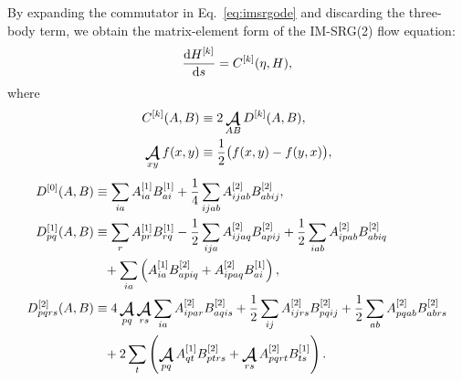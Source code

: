 By expanding the commutator in Eq.\ \eqref{eq:imsrgode} and discarding the three-body term, we obtain the matrix-element form of the IM-SRG(2) flow equation:
\begin{align}
    \frac{\operatorname{d\!} H^{[k]}}{\operatorname{d\!} s} = C^{[k]}(\eta, H), \label{eq:flowmxe}
\end{align}
where
\begin{align}
  C^{[k]}(A, B) &\equiv 2 \antisymm_{A B} D^{[k]}(A, B), \label{eq:commutmxe} \\
  \antisymm_{x y} f(x, y) &\equiv \frac{1}{2} \bigl(f(x, y) - f(y, x)\bigr),
\end{align}
\begin{align}
  D^{[0]}(A, B)
  &\equiv
    \sum_{i a} A^{[1]}_{i a} B^{[1]}_{a i}
    + \frac{1}{4} \sum_{i j a b} A^{[2]}_{i j a b} B^{[2]}_{a b i j},
    \label{eq:flow0} \\
  D^{[1]}_{p q}(A, B)
  &\equiv
    \sum_r A^{[1]}_{p r} B^{[1]}_{r q}
    - \frac{1}{2} \sum_{i j a} A^{[2]}_{i j a q} B^{[2]}_{a p i j}
    + \frac{1}{2} \sum_{i a b} A^{[2]}_{i p a b} B^{[2]}_{a b i q}
    \notag \\
  &\hphantom{=}
    + \sum_{i a} \left(
    A^{[1]}_{i a} B^{[2]}_{a p i q}
    + A^{[2]}_{i p a q} B^{[1]}_{a i}
    \right),
    \label{eq:flow1} \\
  D^{[2]}_{p q r s}(A, B)
  &\equiv
    4 \antisymm_{p q} \antisymm_{r s} \sum_{i a} A^{[2]}_{i p a r} B^{[2]}_{a q i s}
    + \frac{1}{2} \sum_{i j} A^{[2]}_{i j r s} B^{[2]}_{p q i j}
    + \frac{1}{2} \sum_{a b} A^{[2]}_{p q a b} B^{[2]}_{a b r s}
    \notag \\
  &\hphantom{=}
    + 2 \sum_t \left(
    \antisymm_{p q} A^{[1]}_{q t} B^{[2]}_{p t r s}
    + \antisymm_{r s} A^{[2]}_{p q r t} B^{[1]}_{t s}
    \right).
    \label{eq:flow2}
\end{align}

